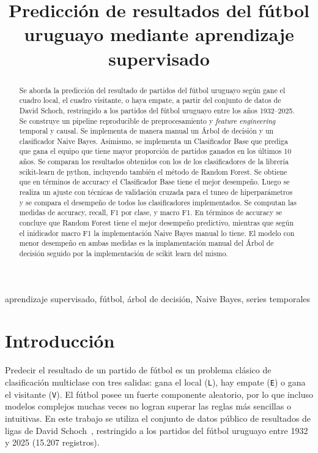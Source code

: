 \documentclass[conference]{IEEEtran}
\begin{document}
\title{Predicción de resultados del fútbol uruguayo mediante aprendizaje supervisado}

\author{
}

\maketitle

\begin{abstract}
Se aborda la predicción del resultado de partidos del fútbol uruguayo según gane el cuadro local, el cuadro visitante, o haya empate, a partir del conjunto de datos de David Schoch, restringido a los partidos del fútbol uruguayo entre los años 1932--2025. Se construye un pipeline reproducible de preprocesamiento y \emph{feature engineering} temporal y causal. Se implementa de manera manual un Árbol de decisión y un clasificador Naive Bayes. Asimismo, se implementa un Clasificador Base que prediga que gana el equipo que tiene mayor proporción de partidos ganados en los últimos 10 años. Se comparan los resultados obtenidos con los de los clasificadores de la librería scikit-learn de python, incluyendo también el método de Random Forest. Se obtiene que en términos de accuracy el Clasificador Base tiene el mejor desempeño. Luego se realiza un ajuste con técnicas de validación cruzada para el tuneo de hiperparámetros y se compara el desempeño de todos los clasificadores implementados. Se computan las medidas de accuracy, recall, F1 por clase, y macro F1. En términos de accuracy se concluye que Random Forest tiene el mejor desempeño predictivo, mientras que según el inidicador macro F1 la implementación Naive Bayes manual lo tiene. El modelo con menor desempeño en ambas medidas es la implamentación manual del Árbol de decisión seguido por la implementación de scikit learn del mismo.
\end{abstract}

\begin{IEEEkeywords}
aprendizaje supervisado, fútbol, árbol de decisión, Naive Bayes, series temporales
\end{IEEEkeywords}

\section{Introducción}
Predecir el resultado de un partido de fútbol es un problema clásico de
clasificación multiclase con tres salidas: gana el local (\texttt{L}), hay empate
(\texttt{E}) o gana el visitante (\texttt{V}). El fútbol posee un fuerte
componente aleatorio, por lo que incluso modelos complejos muchas veces no logran superar las reglas más sencillas o intuitivas. En este trabajo se utiliza el conjunto de
datos público de resultados de ligas de David Schoch~\cite{schoch}, restringido
a los partidos del fútbol uruguayo entre 1932 y 2025 (15.207 registros).
\end{document}
